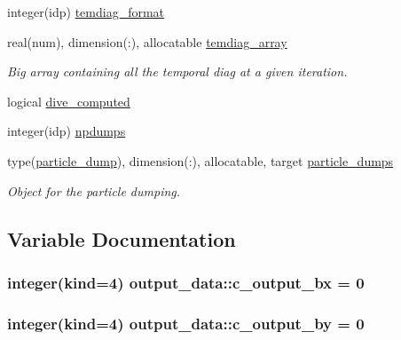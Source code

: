 \begin{DoxyCompactItemize}
\item 
integer(idp) \hyperlink{namespaceoutput__data_a2f4ce5fdd4011f5db5c6b9de97cf133a}{temdiag\+\_\+format}
\item 
real(num), dimension(\+:), allocatable \hyperlink{namespaceoutput__data_a034b19d2c3a5211b1fd96df24cd28dd1}{temdiag\+\_\+array}
\begin{DoxyCompactList}\small\item\em Big array containing all the temporal diag at a given iteration. \end{DoxyCompactList}\item 
logical \hyperlink{namespaceoutput__data_abc6cc1ed098892996b0f0dd858e410d1}{dive\+\_\+computed}
\item 
integer(idp) \hyperlink{namespaceoutput__data_a4dbfde333a6a2225527c27d33472032e}{npdumps}
\item 
type(\hyperlink{structoutput__data_1_1particle__dump}{particle\+\_\+dump}), dimension(\+:), allocatable, target \hyperlink{namespaceoutput__data_a5fbbbcc739158cb15a4a02aa8bc63399}{particle\+\_\+dumps}
\begin{DoxyCompactList}\small\item\em Object for the particle dumping. \end{DoxyCompactList}\end{DoxyCompactItemize}


\subsection{Variable Documentation}
\subsubsection[{\texorpdfstring{c\+\_\+output\+\_\+bx}{c_output_bx}}]{\setlength{\rightskip}{0pt plus 5cm}integer(kind=4) output\+\_\+data\+::c\+\_\+output\+\_\+bx = 0}\hypertarget{namespaceoutput__data_a5f179944d21e0cf92d3dc54e5ff559f6}{}\label{namespaceoutput__data_a5f179944d21e0cf92d3dc54e5ff559f6}
\subsubsection[{\texorpdfstring{c\+\_\+output\+\_\+by}{c_output_by}}]{\setlength{\rightskip}{0pt plus 5cm}integer(kind=4) output\+\_\+data\+::c\+\_\+output\+\_\+by = 0}\hypertarget{namespaceoutput__data_acae721d6bb12191afc82d055a51afaf0}{}\label{namespaceoutput__data_acae721d6bb12191afc82d055a51afaf0}

